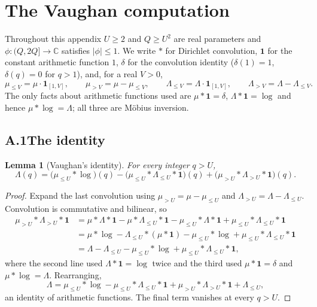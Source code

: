 \documentclass[11pt]{article}
\newtheorem{lemma}[theorem]{Lemma}
\theoremstyle{definition}
\theoremstyle{plain}
\begin{document}
\appendix

\section{The Vaughan computation}\label{app:vaughan}

Throughout this appendix $U\ge2$ and $Q\ge U^{2}$ are real parameters and
$\phi:(Q,2Q]\to\mathbb C$ satisfies $|\phi|\le1$.  We write $*$ for
Dirichlet convolution, $\mathbf 1$ for the constant arithmetic function
$1$, $\delta$ for the convolution identity ($\delta(1)=1$, $\delta(q)=0$
for $q>1$), and, for a real $V>0$,
\[
\mu_{\le V}=\mu\cdot\mathbf 1_{[1,V]},\qquad \mu_{>V}=\mu-\mu_{\le V},
\qquad
\Lambda_{\le V}=\Lambda\cdot\mathbf 1_{[1,V]},\qquad
\Lambda_{>V}=\Lambda-\Lambda_{\le V}.
\]
The only facts about arithmetic functions used are
$\mu*\mathbf 1=\delta$, $\Lambda*\mathbf 1=\log$ and hence
$\mu*\log=\Lambda$; all three are Möbius inversion.

\subsection*{A.1\quad The identity}

\begin{lemma}[Vaughan's identity]\label{lem:vid}
For every integer $q>U$,
\[
\Lambda(q)=\bigl(\mu_{\le U}*\log\bigr)(q)
-\bigl(\mu_{\le U}*\Lambda_{\le U}*\mathbf 1\bigr)(q)
+\bigl(\mu_{>U}*\Lambda_{>U}*\mathbf 1\bigr)(q).
\]
\end{lemma}

\begin{proof}
Expand the last convolution using
$\mu_{>U}=\mu-\mu_{\le U}$ and $\Lambda_{>U}=\Lambda-\Lambda_{\le U}$.
Convolution is commutative and bilinear, so
\begin{align*}
\mu_{>U}*\Lambda_{>U}*\mathbf 1
&=\mu*\Lambda*\mathbf 1-\mu*\Lambda_{\le U}*\mathbf 1
-\mu_{\le U}*\Lambda*\mathbf 1+\mu_{\le U}*\Lambda_{\le U}*\mathbf 1\\
&=\mu*\log-\Lambda_{\le U}*(\mu*\mathbf 1)
-\mu_{\le U}*\log+\mu_{\le U}*\Lambda_{\le U}*\mathbf 1\\
&=\Lambda-\Lambda_{\le U}-\mu_{\le U}*\log
+\mu_{\le U}*\Lambda_{\le U}*\mathbf 1 ,
\end{align*}
where the second line used $\Lambda*\mathbf 1=\log$ twice and the third
used $\mu*\mathbf 1=\delta$ and $\mu*\log=\Lambda$.  Rearranging,
\[
\Lambda=\mu_{\le U}*\log-\mu_{\le U}*\Lambda_{\le U}*\mathbf 1
+\mu_{>U}*\Lambda_{>U}*\mathbf 1+\Lambda_{\le U},
\]
an identity of arithmetic functions.  The final term vanishes at every
$q>U$.
\end{proof}
\end{document}
